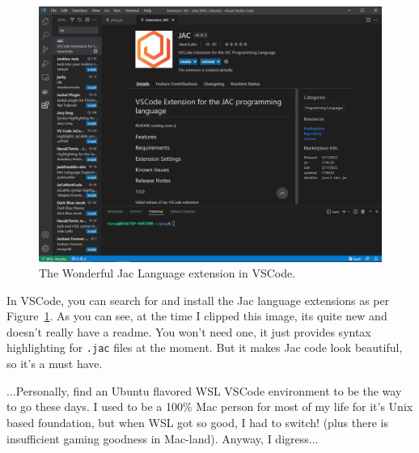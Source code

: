 \begin{figure}
    \centering
    \includegraphics[width=.7\linewidth]{assets/images/vscode_jac_plugin.png}
    \caption[]{The Wonderful Jac Language extension in VSCode.}
    \label{fig:vscode_jac}
\end{figure}

\par
In VSCode, you can search for and install the Jac language extensions as per Figure~\ref{fig:vscode_jac}. As you can see, at the time I clipped this image, its quite new and doesn't really have a readme. You won't need one, it just provides syntax highlighting for \texttt{.jac} files at the moment. But it makes Jac code look beautiful, so it's a must have.

\begin{nerd}
    ...Personally, find an Ubuntu flavored \gls{WSL} VSCode environment to be the way to go these days. I used to be a 100\% Mac person for most of my life for it's Unix based foundation, but when WSL got so good, I had to switch! (plus there is insufficient gaming goodness in Mac-land). Anyway, I digress...
\end{nerd}

